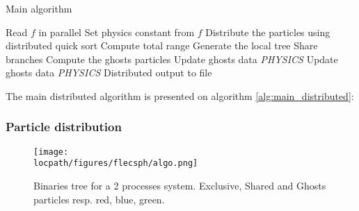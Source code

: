 \begin{algorithm}
\caption{Main algorithm}\label{alg:main_distributed}
\begin{algorithmic}[1]
\State Read $f$ in parallel 
\State Set physics constant from $f$
\State Distribute the particles using distributed quick sort\label{alg_main:qsort}
\State Compute total range 
\State Generate the local tree
\State Share branches\label{alg_main:share_branches}
\State Compute the ghosts particles\label{alg_main:cp_ghosts}
\State Update ghosts data\label{alg_main:up_ghosts}
\State \textit{PHYSICS}
\State Update ghosts data
\State \textit{PHYSICS}
\State Distributed output to file 
\EndWhile
\EndProcedure
\end{algorithmic}
\end{algorithm}


The main distributed algorithm is presented on algorithm \ref{alg:main_distributed}:

\subsubsection{Particle distribution}

\begin{figure*}
\centering
\texttt{[image: \\locpath/figures/flecsph/algo.png]}
\caption{Binaries tree for a 2 processes system. Exclusive, Shared and Ghosts particles resp. red, blue, green.}
\label{fig:big_tree}
\end{figure*}

